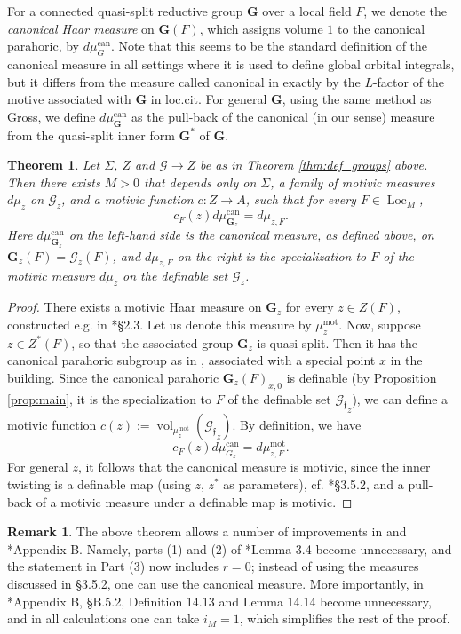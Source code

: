 \documentclass{amsart}
\newcommand{\vol}{\operatorname{vol}}
\newcommand{\loc}{\operatorname{Loc}}
\newcommand{\bG}{\mathbf{G}}
\newcommand{\can}{\mathrm{can}}
\newcommand{\cG}{\mathcal{G}}
\newcommand{\ff}{{\mathfrak f}}
\newcommand\mot{\mathrm{mot}}
\theoremstyle{plain}
\newtheorem{theorem}[thm]{Theorem}
\theoremstyle{definition}
\newtheorem{rem}[thm]{Remark}
\begin{document}
For a connected quasi-split reductive group $\bG$ over a local field $F$, we denote the \emph{canonical Haar measure} on $\bG(F)$, which assigns volume $1$ to the canonical parahoric, by $d\mu_G^\can$. 
Note that this seems to be the standard definition of the canonical measure in all settings where it is used to define global orbital integrals, but it differs from the measure called canonical in \cite{gross:motive} exactly by the $L$-factor of the motive associated with $\bG$ in loc.cit.  For general $\bG$, using the same method as Gross, 
we define $d\mu_{\bG}^\can$ as the pull-back of the canonical (in our sense) measure from the quasi-split inner form $\bG^\ast$ of $\bG$.  

\begin{theorem}\label{thm:mot_meas}
 Let $\Sigma$, $Z$  and $\cG \to Z$ be as in Theorem \ref{thm:def_groups} above. 
Then there exists $M>0$ that depends only on 
$\Sigma$, a family of  motivic measures $d\mu_z$ on $\cG_z$, and a motivic function $c:Z\to A$, such that for every $F\in \loc_M$,
$$c_F(z) d\mu_{\bG_z}^\can = d\mu_{z, F}.$$ 
Here $d\mu_{\bG_z}^\can$ on the left-hand side is the canonical measure, as defined above, on 
$\bG_z(F)=\cG_z(F)$, and $d\mu_{z, F}$ on the right is the specialization to $F$ of the motivic measure $d\mu_z$ on the definable set $\cG_z$. 
\end{theorem} 

\begin{proof} There exists a motivic Haar measure on $\bG_z$ for every $z\in Z(F)$, constructed e.g. in \cite{hales:transfert}*{\S 2.3}. Let us denote this measure by $\mu_z^\mot$. Now, suppose 
$z\in Z^\ast(F)$, so that the associated group $\bG_z$ is quasi-split.  
Then it has the canonical parahoric subgroup as in \cite{gross:motive}, associated with a special point $x$ in the building. 
Since the canonical parahoric $\bG_z(F)_{x, 0}$ is definable (by Proposition \ref{prop:main},
it is the specialization to $F$ of the definable set ${\cG_{\ff}}_z$), we can define  a motivic function $c(z):=\vol_{\mu_z^\mot}({\cG_{\ff}}_z)$. 
By definition, we have 
$$c_F(z) d\mu_{G_z}^\can = d\mu_{z, F}^\mot.$$ 
For general $z$, it follows that the canonical measure is motivic, since the inner twisting is a definable map (using $z$, $z^\ast$ as parameters), cf. \cite{CGH-2}*{\S 3.5.2}, and a pull-back of a motivic measure under a definable map is motivic.
\end{proof}

\begin{rem} The above theorem allows a number of improvements in \cite{CGH-2} and 
\cite{S-T}*{Appendix B}. 
Namely,  parts (1) and (2) of \cite{CGH-2}*{Lemma 3.4} become unnecessary, and the statement in Part (3) now includes $r=0$; instead of using the measures discussed in \S 3.5.2, one can use the canonical measure. 
More importantly, in \cite{S-T}*{Appendix B, \S B.5.2}, Definition 14.13 and Lemma 14.14 become unnecessary, and in all calculations one can take $i_M=1$, which simplifies the rest of the proof.
\end{rem}
\end{document}

